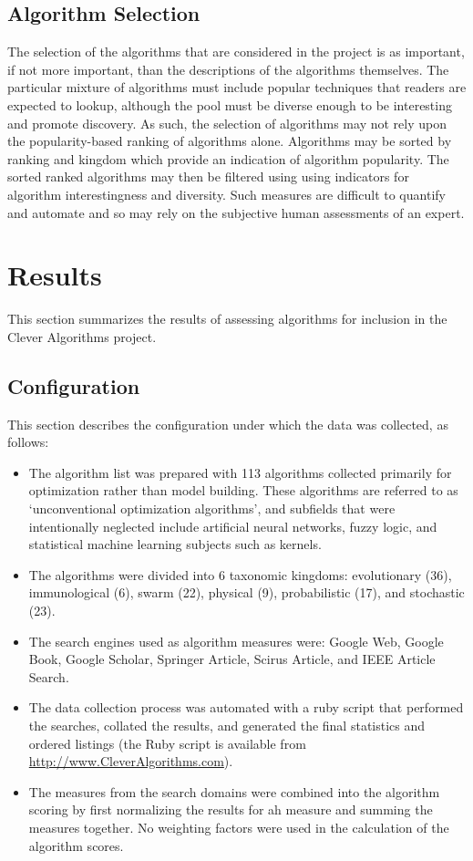 \documentclass[a4paper, 11pt]{article}
\begin{document}
% 
% 
\subsection{Algorithm Selection}
The selection of the algorithms that are considered in the project is as important, if not more important, than the descriptions of the algorithms themselves. The particular mixture of algorithms must include popular techniques that readers are expected to lookup, although the pool must be diverse enough to be interesting and promote discovery. As such, the selection of algorithms may not rely upon the popularity-based ranking of algorithms alone. Algorithms may be sorted by ranking and kingdom which provide an indication of algorithm popularity. The sorted ranked algorithms may then be filtered using using indicators for algorithm interestingness and diversity. Such measures are difficult to quantify and automate and so may rely on the subjective human assessments of an expert. 

% 
% 
\section{Results}
\label{sec:results}
This section summarizes the results of assessing algorithms for inclusion in the Clever Algorithms project.

% 
% 
\subsection{Configuration}
This section describes the configuration under which the data was collected, as follows: 

\begin{itemize}
	\item The algorithm list was prepared with 113 algorithms collected primarily for optimization rather than model building. These algorithms are referred to as `unconventional optimization algorithms', and subfields that were intentionally neglected include artificial neural networks, fuzzy logic, and statistical machine learning subjects such as kernels.
	\item The algorithms were divided into 6 taxonomic kingdoms: evolutionary (36), immunological (6), swarm (22), physical (9), probabilistic (17), and stochastic (23).
	\item The search engines used as algorithm measures were: Google Web, Google Book, Google Scholar, Springer Article, Scirus Article, and IEEE Article Search.
	\item The data collection process was automated with a ruby script that performed the searches, collated the results, and generated the final statistics and ordered listings (the Ruby script is available from \url{http://www.CleverAlgorithms.com}).
	\item The measures from the search domains were combined into the algorithm scoring by first normalizing the results for ah measure and summing the measures together. No weighting factors were used in the calculation of the algorithm scores.
\end{itemize}
\end{document}
